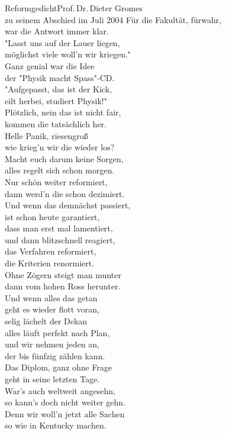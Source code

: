 \begin{lied*}{Reformgedicht}{Prof.\,Dr.\,Dieter Gromes\\zu seinem Abschied im Juli 2004}
Für die Fakultät, fürwahr,\\
war die Antwort immer klar.\\
"Lasst uns auf der Lauer liegen,\\
möglichst viele woll'n wir kriegen."\\
Ganz genial war die Idee\\
der "Physik macht Spass"-CD.\\
"Aufgepasst, das ist der Kick,\\
eilt herbei, studiert Physik!"\\

Plötzlich, nein das ist nicht fair,\\
kommen die tatsächlich her.\\
Helle Panik, riesengroß\\
wie krieg'n wir die wieder los?\\

Macht euch darum keine Sorgen,\\
alles regelt sich schon morgen.\\
Nur schön weiter reformiert,\\
dann werd'n die schon dezimiert.\\
Und wenn das demnächst passiert,\\
ist schon heute garantiert,\\
dass man erst mal lamentiert,\\
und dann blitzschnell reagiert,\\
das Verfahren reformiert,\\
die Kriterien renormiert.\\

Ohne Zögern steigt man munter\\
dann vom hohen Ross herunter.\\
Und wenn alles das getan\\
geht es wieder flott voran,\\
selig lächelt der Dekan\\
alles läuft perfekt nach Plan,\\
und wir nehmen jeden an,\\
der bis fünfzig zählen kann.\\

Das Diplom, ganz ohne Frage\\
geht in seine letzten Tage.\\
War's auch weltweit angesehn,\\
so kann's doch nicht weiter gehn.\\
Denn wir woll'n jetzt alle Sachen\\
so wie in Kentucky machen.\\


\end{lied*}
